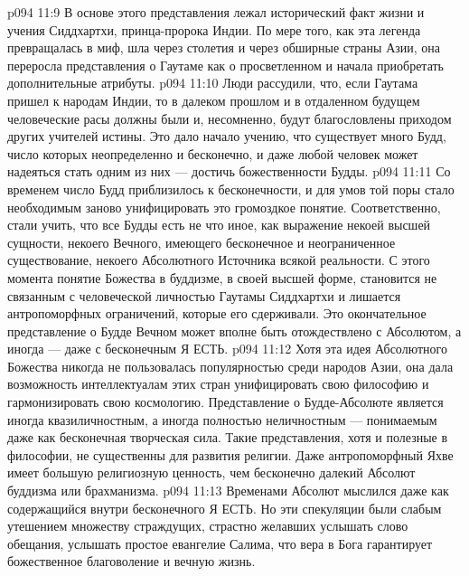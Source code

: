 \vs p094 11:9 \bibnobreakspace {} В основе этого представления лежал исторический факт жизни и учения Сиддхартхи, принца\hyp{}пророка Индии. По мере того, как эта легенда превращалась в миф, шла через столетия и через обширные страны Азии, она переросла представления о Гаутаме как о просветленном и начала приобретать дополнительные атрибуты.
\vs p094 11:10 \bibnobreakspace {} Люди рассудили, что, если Гаутама пришел к народам Индии, то в далеком прошлом и в отдаленном будущем человеческие расы должны были и, несомненно, будут благословлены приходом других учителей истины. Это дало начало учению, что существует много Будд, число которых неопределенно и бесконечно, и даже любой человек может надеяться стать одним из них --- достичь божественности Будды.
\vs p094 11:11 \bibnobreakspace {}  Со временем число Будд приблизилось к бесконечности, и для умов той поры стало необходимым заново унифицировать это громоздкое понятие. Соответственно, стали учить, что все Будды есть не что иное, как выражение некоей высшей сущности, некоего Вечного, имеющего бесконечное и неограниченное существование, некоего Абсолютного Источника всякой реальности. С этого момента понятие Божества в буддизме, в своей высшей форме, становится не связанным с человеческой личностью Гаутамы Сиддхартхи и лишается антропоморфных ограничений, которые его сдерживали. Это окончательное представление о Будде Вечном может вполне быть отождествлено с Абсолютом, а иногда --- даже с бесконечным Я ЕСТЬ.
\vs p094 11:12 \pc Хотя эта идея Абсолютного Божества никогда не пользовалась популярностью среди народов Азии, она дала возможность интеллектуалам этих стран унифицировать свою философию и гармонизировать свою космологию. Представление о Будде\hyp{}Абсолюте является иногда квазиличностным, а иногда полностью неличностным --- понимаемым даже как бесконечная творческая сила. Такие представления, хотя и полезные в философии, не существенны для развития религии. Даже антропоморфный Яхве имеет большую религиозную ценность, чем бесконечно далекий Абсолют буддизма или брахманизма.
\vs p094 11:13 Временами Абсолют мыслился даже как содержащийся внутри бесконечного Я ЕСТЬ. Но эти спекуляции были слабым утешением множеству страждущих, страстно желавших услышать слово обещания, услышать простое евангелие Салима, что вера в Бога гарантирует божественное благоволение и вечную жизнь.
